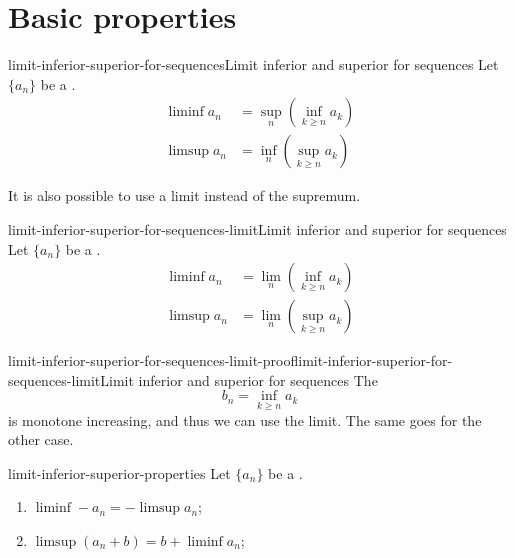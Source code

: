 \documentclass[preview]{standalone}
\begin{document}
\genpage

\section{Basic properties}

\begin{snippetproposition}{limit-inferior-superior-for-sequences}{Limit inferior and superior for sequences}
    Let \(\{a_n\}\) be a \sequence.
    \begin{align*}
        \liminf a_n &= \sup_n \left( \inf_{k\geq n} a_k \right) \\
        \limsup a_n &= \inf_n \left( \sup_{k\geq n} a_k \right)
    \end{align*}
\end{snippetproposition}

\begin{plainhtml}
    It is also possible to use a limit instead of the supremum.
\end{plainhtml}

\begin{snippetproposition}{limit-inferior-superior-for-sequences-limit}{Limit inferior and superior for sequences}
    Let \(\{a_n\}\) be a \sequence.
    \begin{align*}
        \liminf a_n &= \lim_n \left( \inf_{k\geq n} a_k \right) \\
        \limsup a_n &= \lim_n \left( \sup_{k\geq n} a_k \right)
    \end{align*}
\end{snippetproposition}

\begin{snippetproof}{limit-inferior-superior-for-sequences-limit-proof}{limit-inferior-superior-for-sequences-limit}{Limit inferior and superior for sequences}
    The \sequence
    \[
        b_n = \inf_{k\geq n} a_k
    \]
    is monotone increasing, and thus we can use the limit. The same goes for the other case.
\end{snippetproof}

\begin{snippetproposition}{limit-inferior-superior-properties}{}
    Let \(\{a_n\}\) be a \sequence.
    \begin{enumerate}
        \item \(\liminf -a_n = -\limsup a_n\);
        \item \(\limsup(a_n + b) = b + \liminf a_n\);
    \end{enumerate}
\end{snippetproposition}
\end{document}
